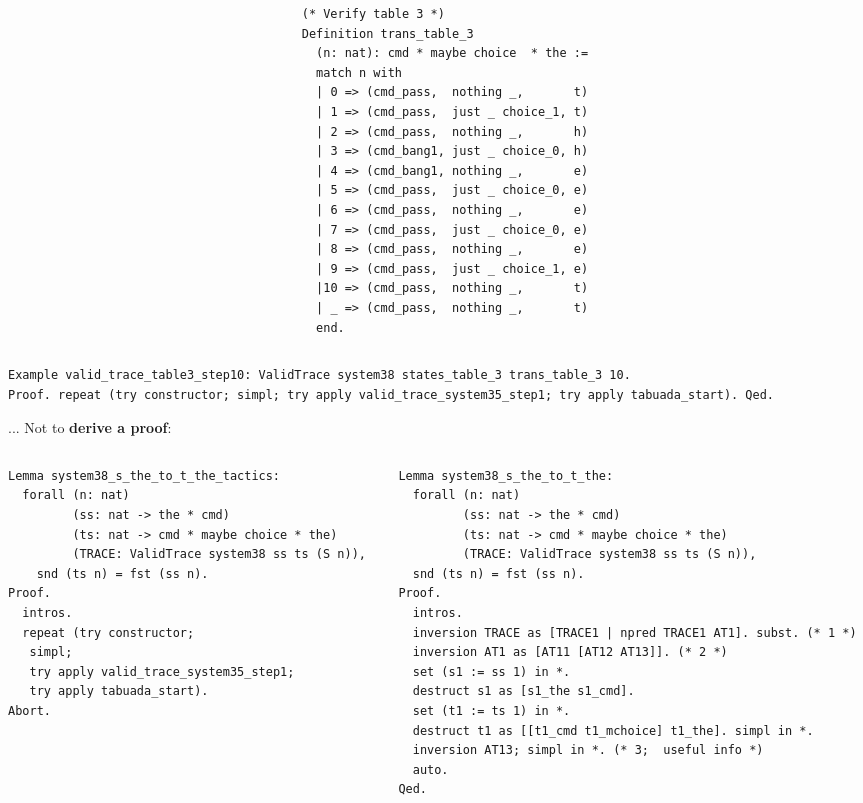 \documentclass{beamer}
\begin{document}
\begin{frame}[fragile]
\begin{columns}[T]
\begin{column}{.3\textwidth}
{ }
\end{column}
\begin{column}{.4\textwidth}
{\fontsize{2.5}{4}\selectfont
\begin{verbatim}
(* Verify table 3 *)
Definition trans_table_3
  (n: nat): cmd * maybe choice  * the :=
  match n with
  | 0 => (cmd_pass,  nothing _,       t)
  | 1 => (cmd_pass,  just _ choice_1, t) 
  | 2 => (cmd_pass,  nothing _,       h) 
  | 3 => (cmd_bang1, just _ choice_0, h) 
  | 4 => (cmd_bang1, nothing _,       e) 
  | 5 => (cmd_pass,  just _ choice_0, e) 
  | 6 => (cmd_pass,  nothing _,       e) 
  | 7 => (cmd_pass,  just _ choice_0, e) 
  | 8 => (cmd_pass,  nothing _,       e) 
  | 9 => (cmd_pass,  just _ choice_1, e) 
  |10 => (cmd_pass,  nothing _,       t) 
  | _ => (cmd_pass,  nothing _,       t)
  end.
\end{verbatim}
}
\end{column}
\end{columns}
{\fontsize{2.5}{4}\selectfont
\begin{verbatim}
Example valid_trace_table3_step10: ValidTrace system38 states_table_3 trans_table_3 10.
Proof. repeat (try constructor; simpl; try apply valid_trace_system35_step1; try apply tabuada_start). Qed.
\end{verbatim}
}
\pause
... Not to \textbf{derive a proof}:
\pause
\begin{columns}[T]
\begin{column}{0.5\textwidth}
{\fontsize{2.5}{4}\selectfont
\begin{verbatim}
Lemma system38_s_the_to_t_the_tactics: 
  forall (n: nat)
         (ss: nat -> the * cmd)
         (ts: nat -> cmd * maybe choice * the)
         (TRACE: ValidTrace system38 ss ts (S n)),
    snd (ts n) = fst (ss n).
Proof.
  intros.
  repeat (try constructor;
   simpl;
   try apply valid_trace_system35_step1;
   try apply tabuada_start).
Abort.
\end{verbatim}
}
\end{column}
\begin{column}{0.5\textwidth}
{\fontsize{2.5}{4}\selectfont
\begin{verbatim}
Lemma system38_s_the_to_t_the: 
  forall (n: nat)
         (ss: nat -> the * cmd)
         (ts: nat -> cmd * maybe choice * the)
         (TRACE: ValidTrace system38 ss ts (S n)),
  snd (ts n) = fst (ss n).
Proof.
  intros.
  inversion TRACE as [TRACE1 | npred TRACE1 AT1]. subst. (* 1 *)
  inversion AT1 as [AT11 [AT12 AT13]]. (* 2 *)
  set (s1 := ss 1) in *.
  destruct s1 as [s1_the s1_cmd].
  set (t1 := ts 1) in *.
  destruct t1 as [[t1_cmd t1_mchoice] t1_the]. simpl in *.
  inversion AT13; simpl in *. (* 3;  useful info *)
  auto.
Qed.
\end{verbatim}
}
\end{column}
\end{columns}

\end{frame}
\end{document}

